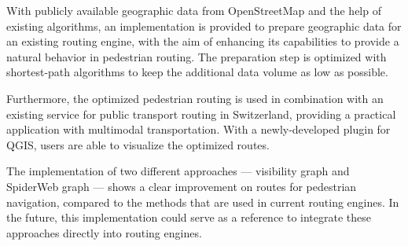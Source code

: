 With publicly available geographic data from OpenStreetMap and the help of existing algorithms, an implementation is provided to prepare geographic data for an existing routing engine, with the aim of enhancing its capabilities to provide a natural behavior in pedestrian routing. The preparation step is optimized with shortest-path algorithms to keep the additional data volume as low as possible.

Furthermore, the optimized pedestrian routing is used in combination with an existing service for public transport routing in Switzerland, providing a practical application with multimodal transportation. With a newly-developed plugin for QGIS, users are able to visualize the optimized routes.

The implementation of two different approaches --- visibility graph and SpiderWeb graph --- shows a clear improvement on routes for pedestrian navigation, compared to the methods that are used in current routing engines. In the future, this implementation could serve as a reference to integrate these approaches directly into routing engines.